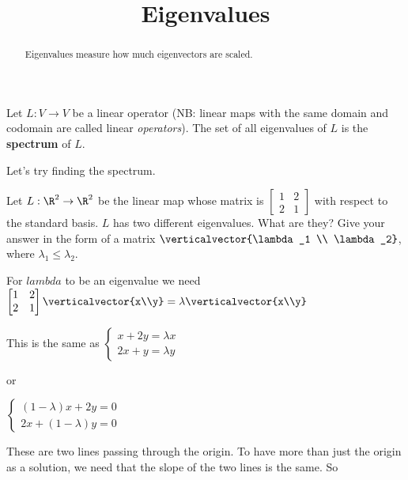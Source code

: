 \documentclass{ximera}
\title{Eigenvalues}
\begin{document}
\begin{abstract}
  Eigenvalues measure how much eigenvectors are scaled.
\end{abstract}

\begin{definition}
  Let $L : V \to V$ be a linear operator (NB: linear maps with the
  same domain and codomain are called linear \textit{operators}).  The
  set of all eigenvalues of $L$ is the \textbf{spectrum} of $L$.
\end{definition}

Let's try finding the spectrum.

\begin{question}
  Let $L :\R^2 \to \R^2$ be the linear map whose matrix is
  \(\begin{bmatrix} 1 & 2 \\2& 1\end{bmatrix}\) with respect to the
  standard basis.  $L$ has two different eigenvalues.  What are they?
  Give your answer in the form of a matrix $\verticalvector{\lambda_1 \\
    \lambda_2}$, where $\lambda_1 \leq \lambda_2$.
	
  \begin{solution}
    \begin{hint}
      For $lambda$ to be an eigenvalue we need
      \(\begin{bmatrix} 1 & 2 \\2& 1\end{bmatrix} \verticalvector{x\\y} = \lambda \verticalvector{x\\y}\)
    \end{hint}
    \begin{hint}
      This is the same as \(\begin{cases}
        x+2y = \lambda x \\
        2x+y =\lambda y
      \end{cases}\)
      
      or
      
      \(\begin{cases}
        (1-\lambda)x+2y = 0 \\
        2x+(1-\lambda)y =0
      \end{cases}\)
      
    \end{hint}
    \begin{hint}
      These are two lines passing through the origin.  To have more than just the origin as a solution, we need that the slope of the two lines is the same.  So
      

\end{hint}
\end{solution}
\end{question}
\end{document}
